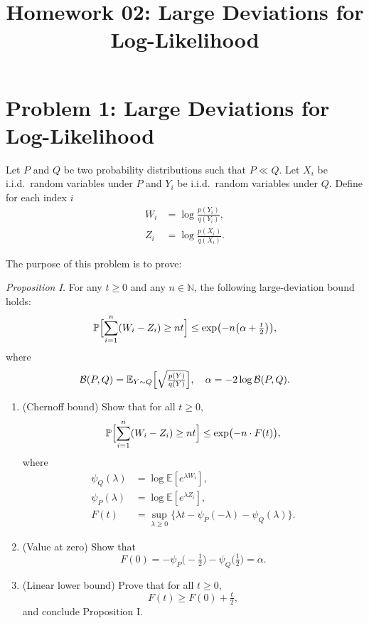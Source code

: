 \documentclass[11pt]{article}
\begin{document}
\title{Homework 02: Large Deviations for Log-Likelihood}
\author{}
\date{}
\maketitle


\section*{Problem 1: Large Deviations for Log-Likelihood}

Let $P$ and $Q$ be two probability distributions such that $P \ll Q$.  Let $X_i$ be i.i.d.\ random variables under $P$ and $Y_i$ be i.i.d.\ random variables under $Q$.  Define for each index $i$
\begin{align*}
W_i &= \log \frac{p(Y_i)}{q(Y_i)}, \\
Z_i &= \log \frac{p(X_i)}{q(X_i)}.
\end{align*}

The purpose of this problem is to prove:

\emph{Proposition I.} For any $t \ge 0$ and any $n \in \mathbb{N}$, the following large-deviation bound holds:
\[
\mathbb{P}\Bigl[\sum_{i=1}^n (W_i - Z_i) \ge nt\Bigr]
\le \exp\bigl(-n\bigl(\alpha + \tfrac{t}{2}\bigr)\bigr),
\]
where
\[
\mathcal{B}(P,Q) = \mathbb{E}_{Y \sim Q}\Bigl[\sqrt{\tfrac{p(Y)}{q(Y)}}\Bigr],
\quad
\alpha = -2 \log \mathcal{B}(P,Q).
\]

\begin{enumerate}[label=\arabic*.]
\item (Chernoff bound) Show that for all $t \ge 0$,
\[
\mathbb{P}\Bigl[\sum_{i=1}^n(W_i - Z_i) \ge nt\Bigr]
\le \exp\bigl(-n \cdot F(t)\bigr),
\]
where
\begin{align*}
\psi_Q(\lambda) &= \log \mathbb{E}[e^{\lambda W_i}],  \\
\psi_P(\lambda) &= \log \mathbb{E}[e^{\lambda Z_i}],  \\
F(t) &= \sup_{\lambda \ge 0} \{\lambda t - \psi_P(-\lambda) - \psi_Q(\lambda)\}.
\end{align*}

\item (Value at zero) Show that
\[
F(0) = -\psi_P\bigl(-\tfrac{1}{2}\bigr) - \psi_Q\bigl(\tfrac{1}{2}\bigr)
= \alpha.
\]

\item (Linear lower bound) Prove that for all $t \ge 0$,
\[
F(t) \ge F(0) + \tfrac{t}{2},
\]
and conclude Proposition I.
\end{enumerate}
\end{document}
